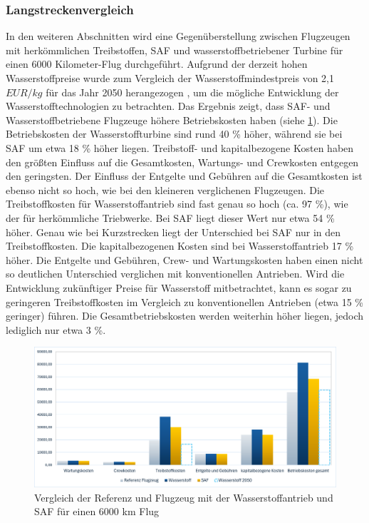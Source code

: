 \subsubsection{Langstreckenvergleich}
In den weiteren Abschnitten wird eine Gegenüberstellung zwischen Flugzeugen mit herkömmlichen Treibstoffen, 
SAF und wasserstoffbetriebener Turbine für einen 6000 Kilometer-Flug durchgeführt. %
Aufgrund der derzeit hohen Wasserstoffpreise wurde zum Vergleich der Wasserstoffmindestpreis 
von 2,1 $EUR/kg$ für das Jahr 2050 herangezogen \cite{hoelzen2022hydrogen}, 
um die mögliche Entwicklung der Wasserstofftechnologien zu betrachten.
%
Das Ergebnis zeigt, dass SAF- und Wasserstoffbetriebene Flugzeuge höhere Betriebskosten haben (siehe \ref{vergleichWA_Ref}).
Die Betriebskosten der Wasserstoffturbine sind rund 40 \% höher, während sie bei SAF um etwa 18 \% höher liegen.
Treibstoff- und kapitalbezogene Kosten haben den größten Einfluss auf die Gesamtkosten, 
Wartungs- und Crewkosten entgegen den geringsten.
Der Einfluss der Entgelte und Gebühren auf die Gesamtkosten ist ebenso nicht so hoch, 
wie bei den kleineren verglichenen Flugzeugen.
Die Treibstoffkosten für Wasserstoffantrieb sind fast genau so hoch (ca. 97 \%), wie der für herkömmliche Triebwerke. 
Bei SAF liegt dieser Wert nur etwa 54 \% höher. 
Genau wie bei Kurzstrecken liegt der Unterschied bei SAF nur in den Treibstoffkosten.
Die kapitalbezogenen Kosten sind bei Wasserstoffantrieb 17 \% höher.
Die Entgelte und Gebühren, Crew- und Wartungskosten haben einen nicht so 
deutlichen Unterschied verglichen mit konventionellen Antrieben. 
%
Wird die Entwicklung zukünftiger Preise für Wasserstoff mitbetrachtet, 
kann es sogar zu geringeren Treibstoffkosten im Vergleich zu konventionellen Antrieben (etwa 15 \% geringer) führen. 
Die Gesamtbetriebskosten werden weiterhin höher liegen, jedoch lediglich nur etwa 3 \%.

\begin{figure}[h]
	\centering
	\includegraphics[width=0.9\linewidth]{Bilder/VergleichWA_SAF.png}
	\caption[Betriebskosten: Vergleich vom Referenzflugzeug mit SAF und Wasserstoffantrieb]{Vergleich der Referenz und Flugzeug mit der Wasserstoffantrieb und SAF für einen 6000 km Flug}
	\label{vergleichWA_Ref}
\end{figure}

